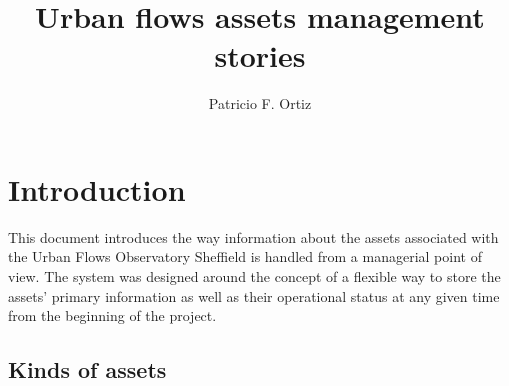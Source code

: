 \documentclass[12pt]{amsart}
\title{Urban flows assets management stories}
\author{Patricio F. Ortiz}
\begin{document}
\maketitle
\tableofcontents

\section{Introduction}
This document introduces the way information about the assets associated with the Urban Flows Observatory Sheffield is handled from a managerial point of view. The system was designed around the concept of a flexible way to store the assets' primary information as well as their operational status at any given time from the beginning of the project.

\subsection{Kinds of assets}
\end{document}
